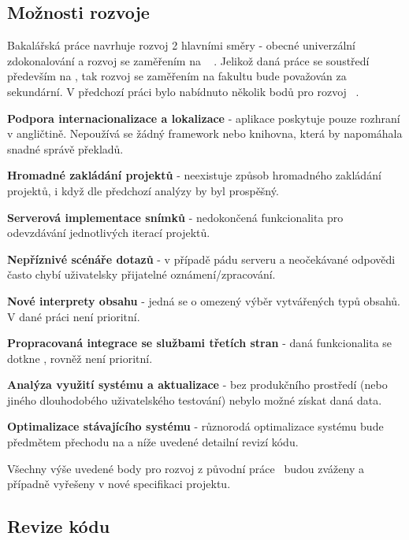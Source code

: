 \subsection{Možnosti rozvoje}

Bakalářská práce navrhuje rozvoj 2 hlavními směry - obecné univerzální zdokonalování a rozvoj se zaměřením na  ~\cite{bachelorthesis} .
Jelikož daná práce se soustředí především na , tak rozvoj se zaměřením na fakultu bude považován za sekundární.
V předchozí práci bylo nabídnuto několik bodů pro rozvoj~\cite{bachelorthesis} .


\begin{ul}
   \item
   \textbf{Podpora internacionalizace a lokalizace} - aplikace poskytuje pouze rozhraní v angličtině.
   Nepoužívá se žádný framework nebo knihovna, která by napomáhala snadné správě překladů.
   \item
   \textbf{Hromadné zakládání projektů} - neexistuje způsob hromadného zakládání projektů, i když dle předchozí analýzy by byl prospěšný.
   \item
   \textbf{Serverová implementace snímků} - nedokončená funkcionalita pro odevzdávání jednotlivých iterací projektů.
   \item
   \textbf{Nepříznivé scénáře  dotazů} - v případě pádu serveru a neočekávané  odpovědi často chybí uživatelsky přijatelné oznámení/zpracování.
   \item
   \textbf{Nové interprety obsahu} - jedná se o omezený výběr vytvářených typů obsahů.
   V dané práci není prioritní.
   \item
   \textbf{Propracovaná integrace se službami třetích stran} - daná funkcionalita se dotkne , rovněž není prioritní.
   \item
   \textbf{Analýza využití systému a aktualizace } - bez produkčního prostředí (nebo jiného dlouhodobého uživatelského testování) nebylo možné získat daná data.
   \item
   \textbf{Optimalizace stávajícího systému} - různorodá optimalizace systému bude předmětem přechodu na  a níže uvedené detailní revizí kódu.
\end{ul}

Všechny výše uvedené body pro rozvoj z původní práce~\cite{bachelorthesis} budou zváženy a případně vyřešeny v nové specifikaci projektu.



\subsection{Revize kódu}

